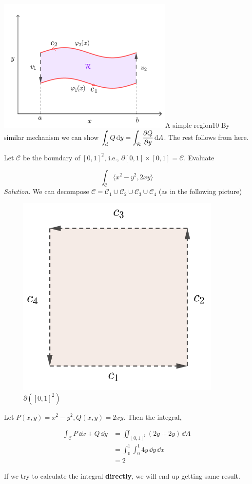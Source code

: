 \documentclass[../Analysis-3.tex]{subfiles}
\begin{document}
\begin{proofFig}{\includegraphics[width=.78\linewidth]{../figures/lec-28.1.png}}{A simple region}{\label{R2:green:thm}}{10}
  By similar mechanism we can show $\displaystyle\int_{\mathcal{C}} Q \, \dd y = \int_{\mathcal{R}} \pdv{Q}{y} \, \dd A$. The rest follows from here.
\end{proofFig}

\begin{Eg}{}{}
  Let $\mathcal{C}$ be the boundary of $[0,1]^2$, i.e., $\partial [0,1]\times[0,1] = \mathcal{C}$. Evaluate

  \[\int_{\mathcal{C}} \langle x^2-y^2,2xy \rangle\]
  \textit{Solution.} We can decompose $\mathcal{C} = \mathcal{C}_1 \cup \mathcal{C}_2 \cup \mathcal{C}_3 \cup \mathcal{C}_4$ (as in the following picture)

  \begin{figure}
    \centering
    \includegraphics[width=.78\linewidth]{../figures/lec-28.2.png}
    \caption{$\partial( [0,1]^2)$}
  \end{figure}

  Let $P(x,y) = x^2 - y^2, Q(x,y) = 2xy$. Then the integral,

  \begin{align*}
    \int_{\mathcal{C}} P \, \dd x + Q \, \dd y
     & = \iint_{[0,1]^2} (2y + 2y) \, \dd A   \tag{Green's Theorem} \\
     & = \int_{0}^1 \int_0^1 4y \, \dd y \, \dd x                   \\
     & = 2
  \end{align*}

  If we try to calculate the integral \textbf{directly}, we will end up getting same result.
\end{Eg}
\end{document}
